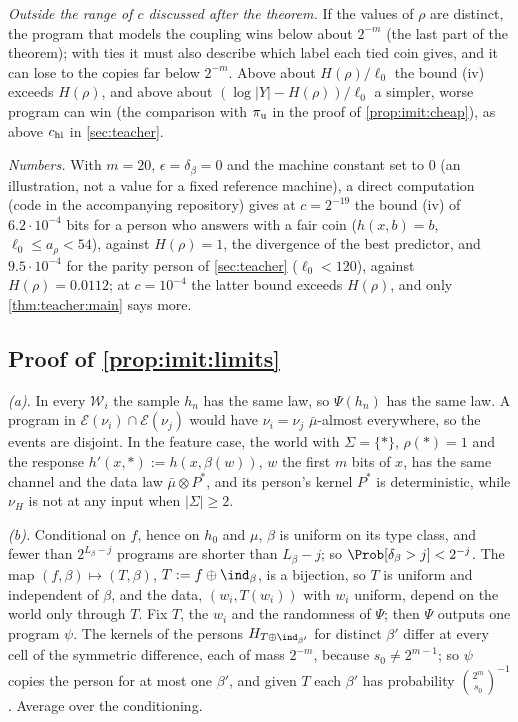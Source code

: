 \emph{Outside the range of $c$ discussed after the theorem.} If the values of $\rho$ are distinct, the program that models the coupling wins below about $2^{-m}$ (the last part of the theorem); with ties it must also describe which label each tied coin gives, and it can lose to the copies far below $2^{-m}$. Above about $H(\rho)/\ell_0$ the bound (iv) exceeds $H(\rho)$, and above about $(\log|Y|-H(\rho))/\ell_0$ a simpler, worse program can win (the comparison with $\pi_{\rm u}$ in the proof of \cref{prop:imit:cheap}), as above $c_{\rm hi}$ in \cref{sec:teacher}.

\emph{Numbers.} With $m=20$, $\epsilon=\delta_\beta=0$ and the machine constant set to $0$ (an illustration, not a value for a fixed reference machine), a direct computation (code in the accompanying repository) gives at $c=2^{-19}$ the bound (iv) of $6.2\cdot10^{-4}$ bits for a person who answers with a fair coin ($h(x,b)=b$, $\ell_0\le a_\rho<54$), against $H(\rho)=1$, the divergence of the best predictor, and $9.5\cdot10^{-4}$ for the parity person of \cref{sec:teacher} ($\ell_0<120$), against $H(\rho)=0.0112$; at $c=10^{-4}$ the latter bound exceeds $H(\rho)$, and only \cref{thm:teacher:main} says more.

\subsection{Proof of \texorpdfstring{\cref{prop:imit:limits}}{the limits of imitation}}\label{app:imit:limits}

\emph{(a).} In every $\mathcal W_i$ the sample $h_n$ has the same law, so $\Psi(h_n)$ has the same law. A program in $\mathcal E(\nu_i)\cap\mathcal E(\nu_j)$ would have $\nu_i=\nu_j$ $\bar\mu$-almost everywhere, so the events are disjoint. In the feature case, the world with $\Sigma=\{\ast\}$, $\rho(\ast)=1$ and the response $h'(x,\ast):=h(x,\beta(w))$, $w$ the first $m$ bits of $x$, has the same channel and the data law $\bar\mu\otimes P^*$, and its person's kernel $P^*$ is deterministic, while $\nu_H$ is not at any input when $|\Sigma|\ge2$.

\emph{(b).} Conditional on $f$, hence on $h_0$ and $\mu$, $\beta$ is uniform on its type class, and fewer than $2^{L_\beta-j}$ programs are shorter than $L_\beta-j$; so $\Prob[\delta_\beta>j]<2^{-j}$. The map $(f,\beta)\mapsto(T,\beta)$, $T:=f\oplus\ind_\beta$, is a bijection, so $T$ is uniform and independent of $\beta$, and the data, $(w_i,T(w_i))$ with $w_i$ uniform, depend on the world only through $T$. Fix $T$, the $w_i$ and the randomness of $\Psi$; then $\Psi$ outputs one program $\psi$. The kernels of the persons $H_{T\oplus\ind_{\beta'}}$ for distinct $\beta'$ differ at every cell of the symmetric difference, each of mass $2^{-m}$, because $s_0\ne2^{m-1}$; so $\psi$ copies the person for at most one $\beta'$, and given $T$ each $\beta'$ has probability $\binom{2^m}{s_0}^{-1}$. Average over the conditioning.

